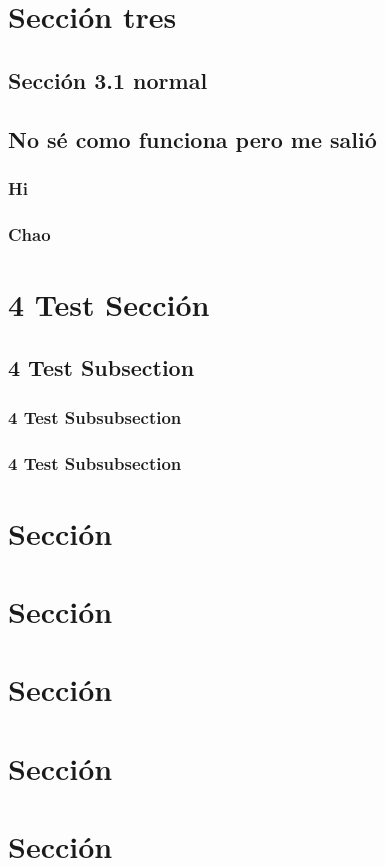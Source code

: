\section{Sección tres}
	\subsection{Sección 3.1 normal}
	\subsection{No sé como funciona pero me salió}
		\subsubsection{Hi}
		\subsubsection{Chao}
		
\section{4 Test Sección}
\subsection{4 Test Subsection}
\subsubsection{4 Test Subsubsection}
\subsubsection{4 Test Subsubsection}
\section{Sección}
\section{Sección}
\section{Sección}
\section{Sección}
\section{Sección}
